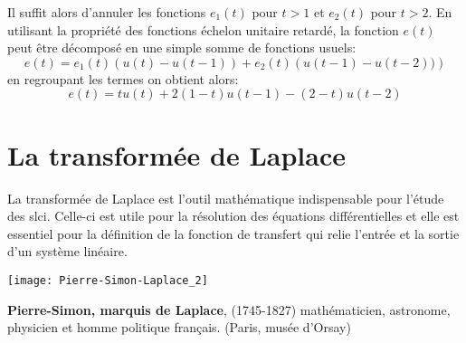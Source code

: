 Il suffit alors d'annuler les fonctions $e_1(t)$ pour $t>1$ et 
$e_2(t)$ pour $t>2$.
En utilisant la propriété des fonctions échelon unitaire retardé, la fonction 
$e(t)$ peut être décomposé en une simple somme de fonctions usuels:
\[
    e(t)=e_1(t)\left(u(t)-u(t-1)\right) + e_2(t)\left(u(t-1)-u(t-2))\right)
\]
en regroupant les termes on obtient alors:
\[
    e(t)=tu(t)+2(1-t)u(t-1)-(2-t)u(t-2)
\]
\newpage

\captionsetup{width=0.9\linewidth,labelfont=bf}
\section{La transformée de Laplace}
La transformée de Laplace est l'outil mathématique indispensable 
pour l'étude des \gls{slci}. Celle-ci est utile pour 
la résolution des équations différentielles 
et elle est essentiel pour la définition de la fonction de transfert qui relie
l'entrée et la sortie d'un système linéaire.
\begin{marginfigure}
    \centering
    \texttt{[image: Pierre-Simon-Laplace\_2]}
    \caption*{\textbf{Pierre-Simon, marquis 
             de Laplace}, (1745-1827) mathématicien, astronome, physicien 
             et homme politique français. (Paris, musée d'Orsay)}
\end{marginfigure}
